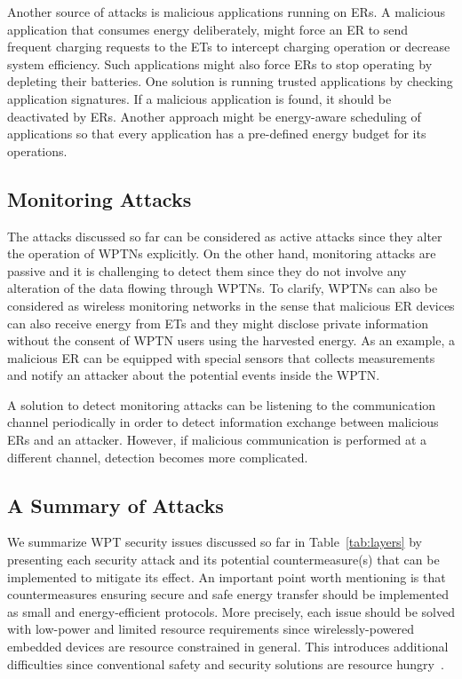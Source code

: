 \documentclass[journal,10pt,draftclsnofoot,onecolumn]{IEEEtran}
\begin{document}
Another source of attacks is malicious applications running on ERs. A malicious application that consumes energy deliberately, might force an ER to send frequent charging requests to the ETs to intercept charging operation or decrease system efficiency. Such applications might also force ERs to stop operating by depleting their batteries. One solution is running trusted applications by checking application signatures. If a malicious application is found, it should be deactivated by ERs. Another approach might be energy-aware scheduling of applications so that every application has a pre-defined energy budget for its operations.

\subsection{Monitoring Attacks}
\label{Monitoring}

The attacks discussed so far can be considered as active attacks since they alter the operation of WPTNs explicitly. On the other hand, monitoring attacks are passive and it is challenging to detect them since they do not involve any alteration of the data flowing through WPTNs. To clarify, WPTNs can also be considered as wireless monitoring networks in the sense that malicious ER devices can also receive energy from ETs and they might disclose private information without the consent of WPTN users using the harvested energy. As an example, a malicious ER can be equipped with special sensors that collects measurements and notify an attacker about the potential events inside the WPTN.

A solution to detect monitoring attacks can be listening to the communication channel periodically in order to detect information exchange between malicious ERs and an attacker. However, if malicious communication is performed at a different channel, detection becomes more complicated. 

\subsection{A Summary of Attacks}

We summarize WPT security issues discussed so far in Table~\ref{tab:layers} by presenting each security attack and its potential countermeasure(s) that can be implemented to mitigate its effect. An important point worth mentioning is that countermeasures ensuring secure and safe energy transfer should be implemented as small and energy-efficient protocols. More precisely, each issue should be solved with low-power and limited resource requirements since wirelessly-powered embedded devices are resource constrained in general. This introduces additional difficulties since conventional safety and security solutions are resource hungry~\cite{trappe2015lowenergysecurity}. 
\end{document}

